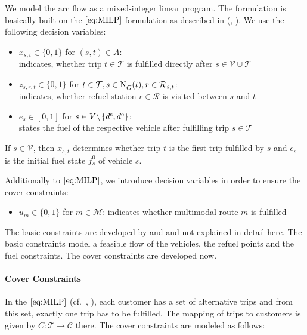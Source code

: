 We model the arc flow as a mixed-integer linear program. The formulation is basically built on the $\eqref{eq:MILP}$ formulation as described in (\cite[p.~34]{Kaiser}, \cite[p.~34]{Knoll}). We use the following decision variables:
\begin{itemize}
	\item{$x_{s,t}\in\{0,1\}$ for $(s,t)\in A$:} \\
	indicates, whether trip $t\in\mathcal{T}$ is fulfilled directly after ${s\in \mathcal{V}\cupdot\mathcal{T}}$
	\item{$z_{s,r,t}\in\{0,1\}$ for $t\in\mathcal{T},s\in\operatorname{N}_G^-(t),r\in\mathcal{R}_{s,t}$:} \\
	indicates, whether refuel station $r\in\mathcal{R}$ is visited between $s$ and $t$
	\item{$e_s\in[0,1]$ for $s\in V\backslash\left\{d^{\operatorname{s}},d^{\operatorname{e}}\right\}$:} \\
	states the fuel of the respective vehicle after fulfilling trip $s\in\mathcal{T}$
\end{itemize}

If $s\in\mathcal{V}$, then $x_{s,t}$ determines whether trip $t$ is the first trip fulfilled by $s$ and $e_s$ is the initial fuel state $f^0_s$ of vehicle $s$.

Additionally to $\eqref{eq:MILP}$, we introduce decision variables in order to ensure the cover constraints:

\begin{itemize}
	\item{$u_m\in\{0,1\}$ for $m\in\mathcal{M}$: indicates whether multimodal route $m$ is fulfilled}
\end{itemize}

The basic constraints are developed by \cite{Kaiser} and \cite{Knoll} and not explained in detail here. The basic constraints model a feasible flow of the vehicles, the refuel points and the fuel constraints. The cover constraints are developed now.

\paragraph{Cover Constraints} \parfill

In the $\eqref{eq:MILP}$ (cf.~\cite[p.~34]{Kaiser}, \cite[p.~34]{Knoll}), each customer has a set of alternative trips and from this set, exactly one trip has to be fulfilled. The mapping of trips to customers is given by ${\widehat{C}:\mathcal{T}\to\mathcal{C}}$ there. The cover constraints are modeled as follows:

